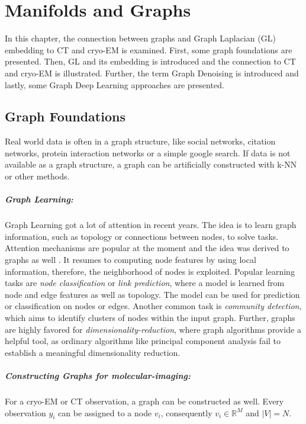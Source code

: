 \chapter{Manifolds and Graphs}
\label{sec:manifold_and_graphs}
    
In this chapter, the connection between graphs and Graph Laplacian (GL) embedding to 
CT and cryo-EM is examined. 
First, some graph foundations are presented.
Then, GL and its embedding is introduced and the connection to CT and cryo-EM is illustrated.
Further, the term Graph Denoising is introduced and lastly, 
some Graph Deep Learning approaches are presented.


\section{Graph Foundations}
Real world data is often in a graph structure, like social networks, citation networks,
protein interaction networks or a simple google search. 
If data is not available as a graph structure, a graph can be artificially constructed with k-NN or other methods.

\paragraph{Graph Learning:} 
Graph Learning got a lot of attention in recent years.
The idea is to learn graph information, such as topology or connections between nodes, to solve tasks.
Attention mechanisms are popular at the moment\cite{transformer} and the idea was derived to graphs as well \cite{GAT}.
It resumes to computing node features by using local information, therefore, the neighborhood of nodes is exploited.
Popular learning tasks are \textit{node classification} or \textit{link prediction}, where a model is learned from node and edge features 
as well as topology. The model can be used for prediction or classification on nodes or edges.
Another common task is \textit{community detection}, which aims to identify clusters of nodes within the input graph.
Further, graphs are highly favored for \textit{dimensionality-reduction}, where 
graph algorithms provide a helpful tool, as ordinary algorithms like principal component analysis fail to 
establish a meaningful dimensionality reduction.


\paragraph{Constructing Graphs for molecular-imaging:}
For a cryo-EM or CT observation, a graph can be constructed as well.
Every observation $y_i$ can be assigned to a node $v_i$, consequently $v_i \in \mathbb{R}^M$ and $|V|=N$.

